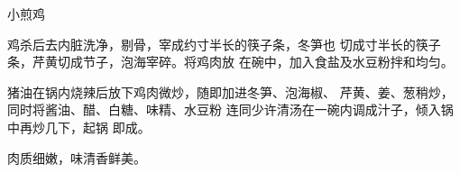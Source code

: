 \begin{recipe}{小煎鸡}

\ingredients


\cooking

鸡杀后去内脏洗净，剔骨，宰成约寸半长的筷子条，冬笋也
切成寸半长的筷子条，芹黄切成节子，泡海宰碎。将鸡肉放
在碗中，加入食盐及水豆粉拌和均匀。

猪油在锅内烧辣后放下鸡肉微炒，随即加进冬笋、泡海椒、
芹黄、姜、葱稍炒，同时将酱油、醋、白糖、味精、水豆粉
连同少许清汤在一碗内调成汁子，倾入锅中再炒几下，起锅
即成。

\notes

肉质细嫩，味清香鲜美。

\end{recipe}


